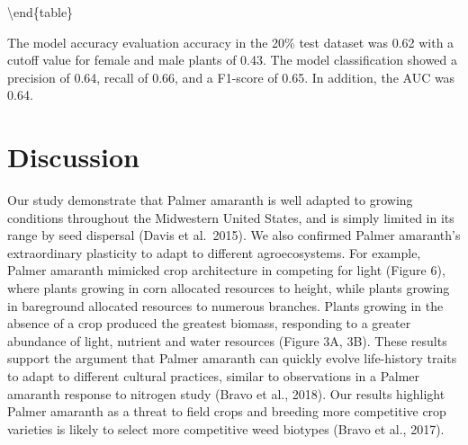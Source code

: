 \documentclass[utf8]{frontiersSCNS}
\begin{document}
\textbackslash end\{table\}

The model accuracy evaluation accuracy in the 20\% test dataset was 0.62
with a cutoff value for female and male plants of 0.43. The model
classification showed a precision of 0.64, recall of 0.66, and a
F1-score of 0.65. In addition, the AUC was 0.64.

\hypertarget{discussion}{%
\section*{Discussion}\label{discussion}}

Our study demonstrate that Palmer amaranth is well adapted to growing
conditions throughout the Midwestern United States, and is simply
limited in its range by seed dispersal (Davis et al.~2015). We also
confirmed Palmer amaranth's extraordinary plasticity to adapt to
different agroecosystems. For example, Palmer amaranth mimicked crop
architecture in competing for light (Figure 6), where plants growing in
corn allocated resources to height, while plants growing in bareground
allocated resources to numerous branches. Plants growing in the absence
of a crop produced the greatest biomass, responding to a greater
abundance of light, nutrient and water resources (Figure 3A, 3B). These
results support the argument that Palmer amaranth can quickly evolve
life-history traits to adapt to different cultural practices, similar to
observations in a Palmer amaranth response to nitrogen study (Bravo et
al., 2018). Our results highlight Palmer amaranth as a threat to field
crops and breeding more competitive crop varieties is likely to select
more competitive weed biotypes (Bravo et al., 2017).
\end{document}
